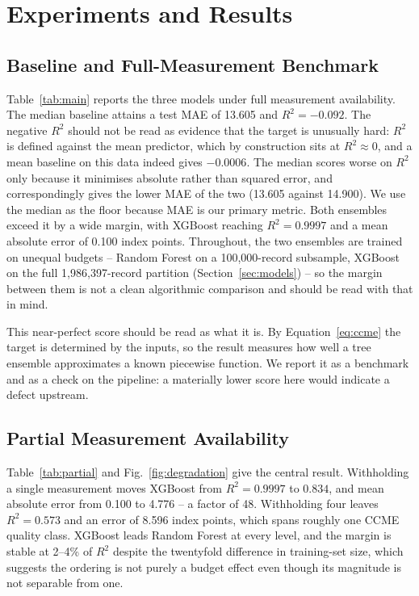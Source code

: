 \section{Experiments and Results}
\label{sec:results}

\subsection{Baseline and Full-Measurement Benchmark}
Table~\ref{tab:main} reports the three models under full measurement availability. The
median baseline attains a test MAE of 13.605 and $R^2 = -0.092$. The negative $R^2$
should not be read as evidence that the target is unusually hard: $R^2$ is defined
against the mean predictor, which by construction sits at $R^2 \approx 0$, and a mean
baseline on this data indeed gives $-0.0006$. The median scores worse on $R^2$ only
because it minimises absolute rather than squared error, and correspondingly gives the
lower MAE of the two (13.605 against 14.900). We use the median as the floor because MAE
is our primary metric. Both ensembles exceed it by a wide margin, with XGBoost
reaching $R^2 = 0.9997$ and a mean absolute error of 0.100 index points. Throughout, the
two ensembles are trained on unequal budgets -- Random Forest on a 100{,}000-record
subsample, XGBoost on the full 1{,}986{,}397-record partition
(Section~\ref{sec:models}) -- so the margin between them is not a clean algorithmic
comparison and should be read with that in mind.

This near-perfect score should be read as what it is. By Equation~\eqref{eq:ccme} the
target is determined by the inputs, so the result measures how well a tree ensemble
approximates a known piecewise function. We report it as a benchmark and as a check on
the pipeline: a materially lower score here would indicate a defect upstream.



\subsection{Partial Measurement Availability}
Table~\ref{tab:partial} and Fig.~\ref{fig:degradation} give the central result.
Withholding a single measurement moves XGBoost from $R^2 = 0.9997$ to $0.834$, and mean
absolute error from 0.100 to 4.776 -- a factor of 48. Withholding four leaves
$R^2 = 0.573$ and an error of 8.596 index points, which spans roughly one CCME quality
class. XGBoost leads Random Forest at every level, and the margin is stable at
2--4\% of $R^2$ despite the twentyfold difference in training-set size, which suggests
the ordering is not purely a budget effect even though its magnitude is not separable
from one.

